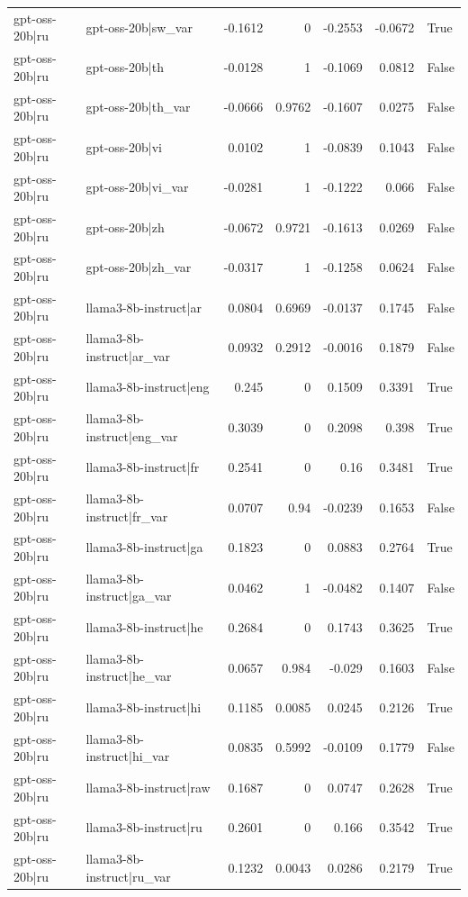 \begin{table}
\begin{tabular}{l l r r r r l}
gpt-oss-20b|ru & gpt-oss-20b|sw_var & -0.1612 & 0 & -0.2553 & -0.0672 & True \\
gpt-oss-20b|ru & gpt-oss-20b|th & -0.0128 & 1 & -0.1069 & 0.0812 & False \\
gpt-oss-20b|ru & gpt-oss-20b|th_var & -0.0666 & 0.9762 & -0.1607 & 0.0275 & False \\
gpt-oss-20b|ru & gpt-oss-20b|vi & 0.0102 & 1 & -0.0839 & 0.1043 & False \\
gpt-oss-20b|ru & gpt-oss-20b|vi_var & -0.0281 & 1 & -0.1222 & 0.066 & False \\
gpt-oss-20b|ru & gpt-oss-20b|zh & -0.0672 & 0.9721 & -0.1613 & 0.0269 & False \\
gpt-oss-20b|ru & gpt-oss-20b|zh_var & -0.0317 & 1 & -0.1258 & 0.0624 & False \\
gpt-oss-20b|ru & llama3-8b-instruct|ar & 0.0804 & 0.6969 & -0.0137 & 0.1745 & False \\
gpt-oss-20b|ru & llama3-8b-instruct|ar_var & 0.0932 & 0.2912 & -0.0016 & 0.1879 & False \\
gpt-oss-20b|ru & llama3-8b-instruct|eng & 0.245 & 0 & 0.1509 & 0.3391 & True \\
gpt-oss-20b|ru & llama3-8b-instruct|eng_var & 0.3039 & 0 & 0.2098 & 0.398 & True \\
gpt-oss-20b|ru & llama3-8b-instruct|fr & 0.2541 & 0 & 0.16 & 0.3481 & True \\
gpt-oss-20b|ru & llama3-8b-instruct|fr_var & 0.0707 & 0.94 & -0.0239 & 0.1653 & False \\
gpt-oss-20b|ru & llama3-8b-instruct|ga & 0.1823 & 0 & 0.0883 & 0.2764 & True \\
gpt-oss-20b|ru & llama3-8b-instruct|ga_var & 0.0462 & 1 & -0.0482 & 0.1407 & False \\
gpt-oss-20b|ru & llama3-8b-instruct|he & 0.2684 & 0 & 0.1743 & 0.3625 & True \\
gpt-oss-20b|ru & llama3-8b-instruct|he_var & 0.0657 & 0.984 & -0.029 & 0.1603 & False \\
gpt-oss-20b|ru & llama3-8b-instruct|hi & 0.1185 & 0.0085 & 0.0245 & 0.2126 & True \\
gpt-oss-20b|ru & llama3-8b-instruct|hi_var & 0.0835 & 0.5992 & -0.0109 & 0.1779 & False \\
gpt-oss-20b|ru & llama3-8b-instruct|raw & 0.1687 & 0 & 0.0747 & 0.2628 & True \\
gpt-oss-20b|ru & llama3-8b-instruct|ru & 0.2601 & 0 & 0.166 & 0.3542 & True \\
gpt-oss-20b|ru & llama3-8b-instruct|ru_var & 0.1232 & 0.0043 & 0.0286 & 0.2179 & True \\

\end{tabular}
\end{table}
